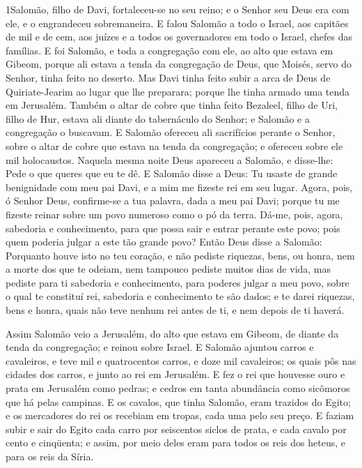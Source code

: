 
\lettrine{1} Salomão, filho de Davi, fortaleceu-se no seu
reino; e o Senhor seu Deus era com ele, e o engrandeceu
sobremaneira. E falou Salomão a todo o Israel, aos capitães de
mil e de cem, aos juízes e a todos os governadores em todo o Israel,
chefes das famílias. E foi Salomão, e toda a congregação com
ele, ao alto que estava em Gibeom, porque ali estava a tenda da
congregação de Deus, que Moisés, servo do Senhor, tinha feito no
deserto. Mas Davi tinha feito subir a arca de Deus de
Quiriate-Jearim ao lugar que lhe preparara; porque lhe tinha armado
uma tenda em Jerusalém. Também o altar de cobre que tinha feito
Bezaleel, filho de Uri, filho de Hur, estava ali diante do
tabernáculo do Senhor; e Salomão e a congregação o buscavam. E
Salomão ofereceu ali sacrifícios perante o Senhor, sobre o altar de
cobre que estava na tenda da congregação; e ofereceu sobre ele mil
holocaustos. Naquela mesma noite Deus apareceu a Salomão, e
disse-lhe: Pede o que queres que eu te dê. E Salomão disse a
Deus: Tu usaste de grande benignidade com meu pai Davi, e a mim me
fizeste rei em seu lugar. Agora, pois, ó Senhor Deus,
confirme-se a tua palavra, dada a meu pai Davi; porque tu me fizeste
reinar sobre um povo numeroso como o pó da terra. Dá-me,
pois, agora, sabedoria e conhecimento, para que possa sair e entrar
perante este povo; pois quem poderia julgar a este tão grande povo?
Então Deus disse a Salomão: Porquanto houve isto no teu
coração, e não pediste riquezas, bens, ou honra, nem a morte dos que
te odeiam, nem tampouco pediste muitos dias de vida, mas pediste
para ti sabedoria e conhecimento, para poderes julgar a meu povo,
sobre o qual te constituí rei, sabedoria e conhecimento te
são dados; e te darei riquezas, bens e honra, quais não teve nenhum
rei antes de ti, e nem depois de ti haverá.

Assim Salomão veio a Jerusalém, do alto que estava em Gibeom, de
diante da tenda da congregação; e reinou sobre Israel. E
Salomão ajuntou carros e cavaleiros, e teve mil e quatrocentos
carros, e doze mil cavaleiros; os quais pôs nas cidades dos carros,
e junto ao rei em Jerusalém. E fez o rei que houvesse ouro e
prata em Jerusalém como pedras; e cedros em tanta abundância como
sicômoros que há pelas campinas. E os cavalos, que tinha
Salomão, eram trazidos do Egito; e os mercadores do rei os recebiam
em tropas, cada uma pelo seu preço. E faziam subir e sair do
Egito cada carro por seiscentos siclos de prata, e cada cavalo por
cento e cinqüenta; e assim, por meio deles eram para todos os reis
dos heteus, e para os reis da Síria.

